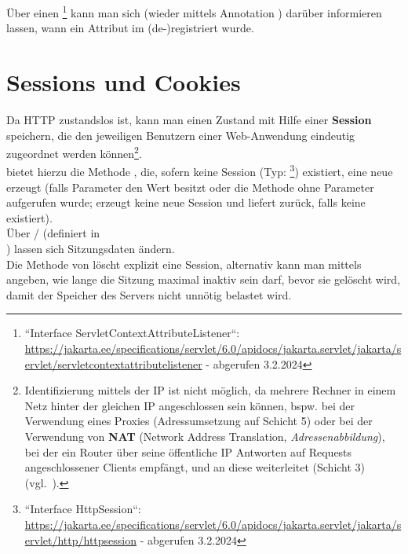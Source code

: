 \noindent
Über einen \footnote{
    ``Interface ServletContextAttributeListener``: \url{https://jakarta.ee/specifications/servlet/6.0/apidocs/jakarta.servlet/jakarta/servlet/servletcontextattributelistener} - abgerufen 3.2.2024
} kann man sich (wieder mittels Annotation ) darüber informieren lassen, wann ein Attribut im  (de-)registriert wurde.

\section{Sessions und Cookies}

Da HTTP zustandslos ist, kann man einen Zustand mit Hilfe einer \textbf{Session} speichern, die den jeweiligen Benutzern einer Web-Anwendung eindeutig zugeordnet werden können\footnote{
Identifizierung mittels der IP ist nicht möglich, da mehrere Rechner in einem Netz hinter der gleichen IP angeschlossen sein können, bspw. bei der Verwendung eines Proxies (Adressumsetzung auf Schicht 5) oder bei der Verwendung von \textbf{NAT} (Network Address Translation, \textit{Adressenabbildung}), bei der ein Router über seine öffentliche IP Antworten auf Requests angeschlossener Clients empfängt, und an diese weiterleitet (Schicht 3) (vgl.~\cite[425]{Oec22}).
}.\\

\noindent
{} bietet hierzu die Methode , die, sofern keine Session (Typ: \footnote{
``Interface HttpSession``: \url{https://jakarta.ee/specifications/servlet/6.0/apidocs/jakarta.servlet/jakarta/servlet/http/httpsession} - abgerufen 3.2.2024
}) existiert, eine neue erzeugt (falls Parameter  den Wert  besitzt oder die Methode ohne Parameter aufgerufen wurde;  erzeugt keine neue Session und liefert  zurück, falls keine existiert).\\

\noindent
Über  /   (definiert in\\ ) lassen sich Sitzungsdaten ändern.\\

\noindent
Die Methode  von  löscht explizit eine Session, alternativ kann man mittels  angeben, wie lange die Sitzung maximal inaktiv sein darf, bevor sie gelöscht wird, damit der Speicher des Servers nicht unnötig belastet wird.


